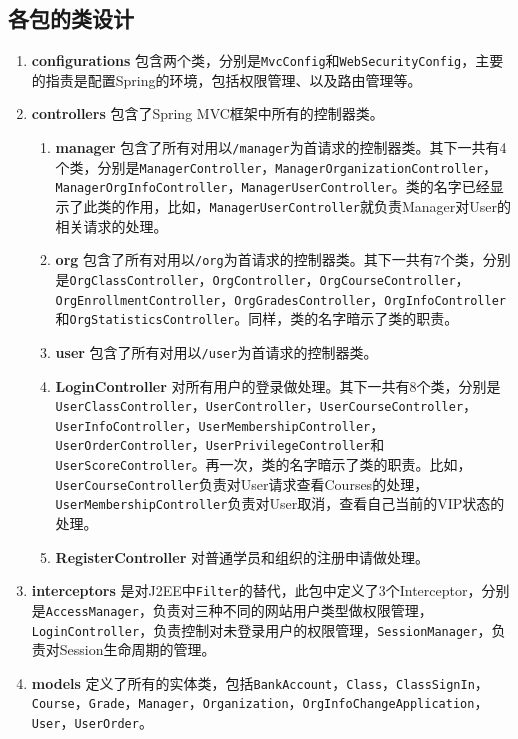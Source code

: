 \documentclass[11pt]{article}
\begin{document}
\subsection{各包的类设计}
\begin{enumerate}
    \item \textbf{configurations} 包含两个类，分别是\texttt{MvcConfig}和\texttt{WebSecurityConfig}，主要的指责是配置Spring的环境，包括权限管理、以及路由管理等。
    \item \textbf{controllers} 包含了Spring MVC框架中所有的控制器类。
    \begin{enumerate}
      \item \textbf{manager} 包含了所有对用以\texttt{/manager}为首请求的控制器类。其下一共有4个类，分别是\texttt{ManagerController}，\texttt{ManagerOrganizationController}，\texttt{ManagerOrgInfoController}，\texttt{ManagerUserController}。类的名字已经显示了此类的作用，比如，\texttt{ManagerUserController}就负责Manager对User的相关请求的处理。
      \item \textbf{org} 包含了所有对用以\texttt{/org}为首请求的控制器类。其下一共有7个类，分别是\texttt{OrgClassController}，\texttt{OrgController}，\texttt{OrgCourseController}，\texttt{OrgEnrollmentController}，\texttt{OrgGradesController}，\texttt{OrgInfoController}和\texttt{OrgStatisticsController}。同样，类的名字暗示了类的职责。
      \item \textbf{user} 包含了所有对用以\texttt{/user}为首请求的控制器类。
      \item \textbf{LoginController} 对所有用户的登录做处理。其下一共有8个类，分别是\texttt{UserClassController}，\texttt{UserController}，\texttt{UserCourseController}，\texttt{UserInfoController}，\texttt{UserMembershipController}，\texttt{UserOrderController}，\texttt{UserPrivilegeController}和\texttt{UserScoreController}。再一次，类的名字暗示了类的职责。比如，\texttt{UserCourseController}负责对User请求查看Courses的处理，\texttt{UserMembershipController}负责对User取消，查看自己当前的VIP状态的处理。
      \item \textbf{RegisterController} 对普通学员和组织的注册申请做处理。
    \end{enumerate}
    \item \textbf{interceptors} 是对J2EE中\texttt{Filter}的替代，此包中定义了3个Interceptor，分别是\texttt{AccessManager}，负责对三种不同的网站用户类型做权限管理，\texttt{LoginController}，负责控制对未登录用户的权限管理，\texttt{SessionManager}，负责对Session生命周期的管理。
    \item \textbf{models} 定义了所有的实体类，包括\texttt{BankAccount}，\texttt{Class}，\texttt{ClassSignIn}，\texttt{Course}，\texttt{Grade}，\texttt{Manager}，\texttt{Organization}，\texttt{OrgInfoChangeApplication}，\texttt{User}，\texttt{UserOrder}。

\end{enumerate}
\end{document}
